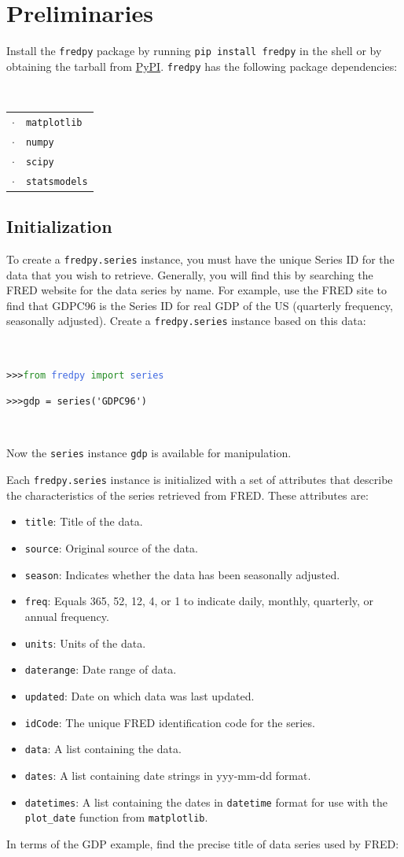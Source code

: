 \documentclass[11pt,fleqn]{article}
\newcommand{\IZ}{\begin{itemize}}
\newcommand{\ZI}{\end{itemize}}
\newcommand{\itemb}{\item[]}
\newcommand{\ttt}{\texttt}
\newcommand{\tc}{\textcolor}
\begin{document}
\section{Preliminaries}

Install the \ttt{fredpy} package by running \ttt{pip install fredpy} in the shell or by obtaining the tarball from \href{https://pypi.python.org/pypi/fredpy/0.1.0a}{PyPI}. \ttt{fredpy} has the following package dependencies:

\

\begin{tabular}{rl} 
 $\cdot$ & \ttt{matplotlib}\\
 $\cdot$ & \ttt{numpy}     \\
 $\cdot$ & \ttt{scipy}     \\ 
 $\cdot$ & \ttt{statsmodels}
\end{tabular}

\subsection{Initialization}

To create a \ttt{fredpy.series} instance, you must have the unique Series ID for the data that you wish to retrieve. Generally, you will find this by searching the FRED website for the data series by name. For example, use the FRED site to find that GDPC96 is the Series ID for real GDP of the US (quarterly frequency, seasonally adjusted). Create a \ttt{fredpy.series} instance based on this data:

\

\begin{minipage}{6.5in}
\ttt{>>>\tc{ForestGreen}{from} \tc{RoyalBlue}{fredpy} \tc{ForestGreen}{import} \tc{RoyalBlue}{series}}

\verb!>>>gdp = series('GDPC96')!
\end{minipage}

\

\noindent Now the \ttt{series} instance \ttt{gdp} is available for manipulation. 

Each \ttt{fredpy.series} instance is initialized with a set of attributes that describe the characteristics of the series retrieved from FRED. These attributes are:
	\IZ
	\itemb \ttt{title}: Title of the data.
	\itemb \ttt{source}: Original source of the data.
	\itemb \ttt{season}: Indicates whether the data has been seasonally adjusted.
	\itemb \ttt{freq}: Equals 365, 52, 12, 4, or 1 to indicate daily, monthly, quarterly, or annual frequency.
	\itemb \ttt{units}: Units of the data.
	\itemb \ttt{daterange}: Date range of data.
	\itemb \ttt{updated}: Date on which data was last updated.
	\itemb \ttt{idCode}: The unique FRED identification code for the series.
	\itemb \ttt{data}: A list containing the data.
	\itemb \ttt{dates}: A list containing date strings in yyy-mm-dd format.
	\itemb \ttt{datetimes}: A list containing the dates in \ttt{datetime} format for use with the \verb!plot_date! function from \ttt{matplotlib}.
	\ZI
In terms of the GDP example, find the precise title of data series used by FRED:
\end{document}

